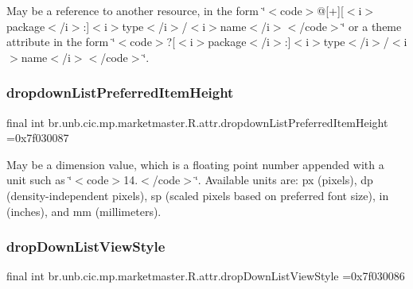 May be a reference to another resource, in the form \char`\"{}$<$code$>$@\mbox{[}+\mbox{]}\mbox{[}$<$i$>$package$<$/i$>$\+:\mbox{]}$<$i$>$type$<$/i$>$/$<$i$>$name$<$/i$>$$<$/code$>$\char`\"{} or a theme attribute in the form \char`\"{}$<$code$>$?\mbox{[}$<$i$>$package$<$/i$>$\+:\mbox{]}$<$i$>$type$<$/i$>$/$<$i$>$name$<$/i$>$$<$/code$>$\char`\"{}. \mbox{\label{classbr_1_1unb_1_1cic_1_1mp_1_1marketmaster_1_1R_1_1attr_ac386de33420920ef173d44b07086bdac}} 
\subsubsection{\texorpdfstring{dropdown\+List\+Preferred\+Item\+Height}{dropdownListPreferredItemHeight}}
{\footnotesize\ttfamily final int br.\+unb.\+cic.\+mp.\+marketmaster.\+R.\+attr.\+dropdown\+List\+Preferred\+Item\+Height =0x7f030087\hspace{0.3cm}{\ttfamily [static]}}

May be a dimension value, which is a floating point number appended with a unit such as \char`\"{}$<$code$>$14.\+5sp$<$/code$>$\char`\"{}. Available units are\+: px (pixels), dp (density-\/independent pixels), sp (scaled pixels based on preferred font size), in (inches), and mm (millimeters). \mbox{\label{classbr_1_1unb_1_1cic_1_1mp_1_1marketmaster_1_1R_1_1attr_ac09151ccedd5e7b6ead32f0ab846bee0}} 
\subsubsection{\texorpdfstring{drop\+Down\+List\+View\+Style}{dropDownListViewStyle}}
{\footnotesize\ttfamily final int br.\+unb.\+cic.\+mp.\+marketmaster.\+R.\+attr.\+drop\+Down\+List\+View\+Style =0x7f030086\hspace{0.3cm}{\ttfamily [static]}}

